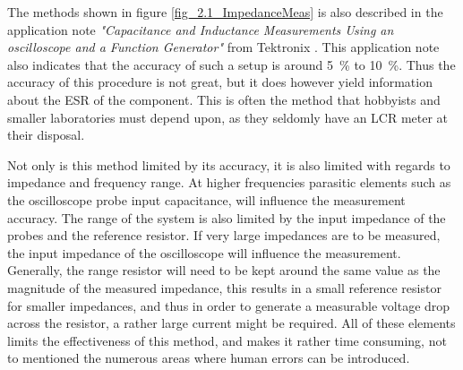 The methods shown in figure \ref{fig_2.1_ImpedanceMeas} is also described in the application note \textit{"Capacitance and Inductance Measurements Using an oscilloscope and a Function Generator"} from Tektronix \Cite{TextronixZMeas}. This application note also indicates that the accuracy of such a setup is around \SI{5}{\%} to \SI{10}{\%}. Thus the accuracy of this procedure is not great, but it does however yield information about the ESR of the component. This is often the method that hobbyists and smaller laboratories must depend upon, as they seldomly have an LCR meter at their disposal. 

Not only is this method limited by its accuracy, it is also limited with regards to impedance and frequency range. At higher frequencies parasitic elements such as the oscilloscope probe input capacitance, will influence the measurement accuracy. The range of the system is also limited by the input impedance of the probes and the reference resistor. If very large impedances are to be measured, the input impedance of the oscilloscope will influence the measurement. Generally, the range resistor will need to be kept around  the same value as the magnitude of the measured impedance, this results in a small reference resistor for smaller impedances, and thus in order to generate a measurable voltage drop across the resistor, a rather large current might be required. All of these elements limits the effectiveness of this method, and makes it rather time consuming, not to mentioned the numerous areas where human errors can be introduced.
